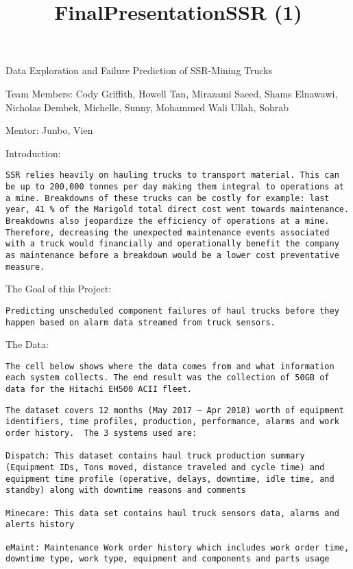 \documentclass[11pt]{article}
\title{FinalPresentationSSR (1)}
\begin{document}
    
    
    \maketitle
    
    

    
    Data Exploration and Failure Prediction of SSR-Mining Trucks

Team Members: Cody Griffith, Howell Tan, Mirazami Saeed, Shams Elnawawi,
Nicholas Dembek, Michelle, Sunny, Mohammed Wali Ullah, Sohrab

Mentor: Junbo, Vien

    Introduction:

\begin{verbatim}
SSR relies heavily on hauling trucks to transport material. This can be up to 200,000 tonnes per day making them integral to operations at a mine. Breakdowns of these trucks can be costly for example: last year, 41 % of the Marigold total direct cost went towards maintenance. Breakdowns also jeopardize the efficiency of operations at a mine. Therefore, decreasing the unexpected maintenance events associated with a truck would financially and operationally benefit the company as maintenance before a breakdown would be a lower cost preventative measure. 
\end{verbatim}

    The Goal of this Project:

\begin{verbatim}
Predicting unscheduled component failures of haul trucks before they happen based on alarm data streamed from truck sensors.
\end{verbatim}

    The Data:

\begin{verbatim}
The cell below shows where the data comes from and what information each system collects. The end result was the collection of 50GB of data for the Hitachi EH500 ACII fleet. 
\end{verbatim}

    \begin{verbatim}
The dataset covers 12 months (May 2017 – Apr 2018) worth of equipment identifiers, time profiles, production, performance, alarms and work order history.  The 3 systems used are:

Dispatch: This dataset contains haul truck production summary (Equipment IDs, Tons moved, distance traveled and cycle time) and equipment time profile (operative, delays, downtime, idle time, and standby) along with downtime reasons and comments 

Minecare: This data set contains haul truck sensors data, alarms and alerts history

eMaint: Maintenance Work order history which includes work order time, downtime type, work type, equipment and components and parts usage
\end{verbatim}
\end{document}
